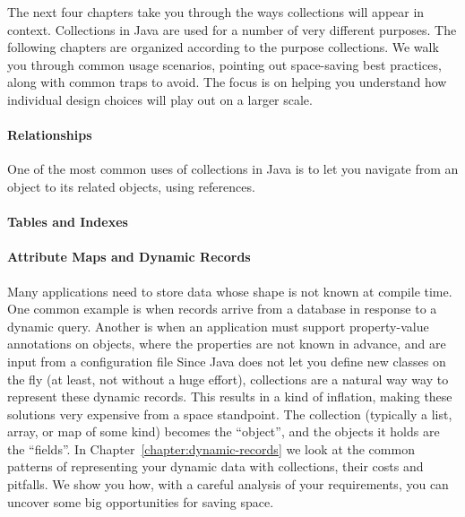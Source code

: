 The next four chapters take you through the ways collections will appear in
context. Collections in Java are used for a number of very different
purposes.  The following chapters are organized according to the purpose
collections. We walk you through common usage
scenarios, pointing out space-saving best practices, along with common traps to avoid. The focus is on
helping you understand how individual design choices will play out on a
larger scale.


\paragraph{Relationships}  One of the most common uses of collections in Java is
to let you navigate from an object to its related objects, using references.

\paragraph{Tables and Indexes}

\paragraph{Attribute Maps and Dynamic Records}
Many applications need to store data whose shape is not
known at compile time.  One common example is when
records arrive from a database in response to a dynamic query. Another is when
an application must support property-value annotations on objects, where the
properties are not known in advance, and are input from a configuration file 
Since Java does not let you define new classes on the fly (at
least, not without a huge effort), collections are a natural way way to represent 
these dynamic records. 
This results in a kind of inflation, making these solutions very expensive
from a space standpoint. The collection (typically a list, array, or map of some kind)
becomes the ``object'', and the objects it holds are the ``fields''. 
In Chapter~\ref{chapter:dynamic-records} we look at the
common patterns of representing your dynamic data with collections, their
costs and pitfalls. We show you how, with a careful analysis of your
requirements, you can uncover some big opportunities for saving space.

